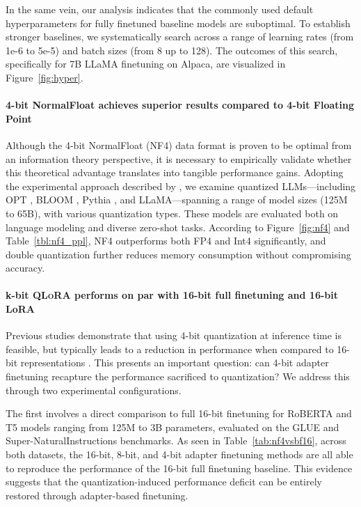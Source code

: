 In the same vein, our analysis indicates that the commonly used default hyperparameters for fully finetuned baseline models are suboptimal. To establish stronger baselines, we systematically search across a range of learning rates (from 1e-6 to 5e-5) and batch sizes (from 8 up to 128). The outcomes of this search, specifically for 7B LLaMA finetuning on Alpaca, are visualized in Figure~\ref{fig:hyper}.

\paragraph{4-bit NormalFloat achieves superior results compared to 4-bit Floating Point}

Although the 4-bit NormalFloat (NF4) data format is proven to be optimal from an information theory perspective, it is necessary to empirically validate whether this theoretical advantage translates into tangible performance gains. Adopting the experimental approach described by \citet{dettmers2022case}, we examine quantized LLMs—including OPT \citep{zhang2022opt}, BLOOM \cite{scao2022bloom}, Pythia \cite{biderman2023pythia}, and LLaMA—spanning a range of model sizes (125M to 65B), with various quantization types. These models are evaluated both on language modeling and diverse zero-shot tasks. According to Figure~\ref{fig:nf4} and Table~\ref{tbl:nf4_ppl}, NF4 outperforms both FP4 and Int4 significantly, and double quantization further reduces memory consumption without compromising accuracy.

\paragraph{k-bit \textsc{QLoRA} performs on par with 16-bit full finetuning and 16-bit LoRA}

Previous studies demonstrate that using 4-bit quantization at inference time is feasible, but typically leads to a reduction in performance when compared to 16-bit representations \citep{dettmers2022case,frantar2022gptq}. This presents an important question: can 4-bit adapter finetuning recapture the performance sacrificed to quantization? We address this through two experimental configurations.

The first involves a direct comparison to full 16-bit finetuning for RoBERTA and T5 models ranging from 125M to 3B parameters, evaluated on the GLUE and Super-NaturalInstructions benchmarks. As seen in Table~\ref{tab:nf4vsbf16}, across both datasets, the 16-bit, 8-bit, and 4-bit adapter finetuning methods are all able to reproduce the performance of the 16-bit full finetuning baseline. This evidence suggests that the quantization-induced performance deficit can be entirely restored through adapter-based finetuning.

